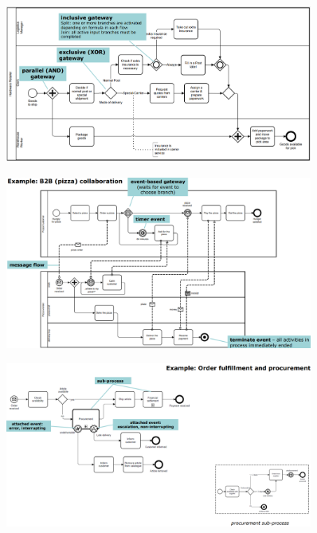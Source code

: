\documentclass[10pt,a4paper]{report}
\begin{document}
\begin{figure}[h]
	\centering
	\includegraphics[width=0.9\textwidth]{image75}	
	\caption{}
	\label{image75}
\end{figure}

\begin{figure}[h]
	\centering
	\includegraphics[width=0.9\textwidth]{image76}
	\caption{}
	\label{image76}
\end{figure}


\begin{figure}[h]
	\centering
	\includegraphics[width=0.9\textwidth]{image77}
		\caption{}
	\label{image77}
\end{figure}
\end{document}
